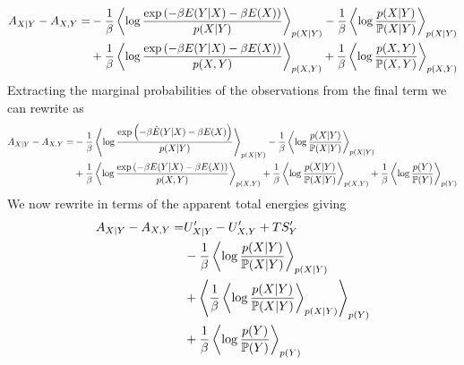 \documentclass[]{article}
\begin{document}
%
\begin{align*}
A_{X|Y} - A_{X,Y} =  & -\frac{1}{\beta}\left\langle \log \frac{\exp\left(-\beta E(Y|X) -\beta E(X)\right)}{p(X|Y) } \right\rangle_{p(X|Y) } - \frac{1}{\beta}\left\langle \log \frac{p(X|Y)}{\mathbb{P}(X|Y) } \right\rangle_{p(X|Y) }\\
& +\frac{1}{\beta}\left\langle \log \frac{\exp\left(-\beta E(Y|X) -\beta E(X)\right)}{p(X,Y) } \right\rangle_{p(X,Y) } + \frac{1}{\beta}\left\langle \log \frac{p(X,Y)}{\mathbb{P}(X,Y) } \right\rangle_{p(X,Y) }
\end{align*} 
Extracting the marginal probabilities of the observations from the final term we can rewrite as 
\begin{align*}
A_{X|Y} - A_{X,Y} =  & -\frac{1}{\beta}\left\langle \log \frac{\exp\left(-\beta \hat{E}(Y|X) -\beta E(X)\right)}{p(X|Y) } \right\rangle_{p(X|Y) } - \frac{1}{\beta}\left\langle \log \frac{p(X|Y)}{\mathbb{P}(X|Y) } \right\rangle_{p(X|Y) }\\
& +\frac{1}{\beta}\left\langle \log \frac{\exp\left(-\beta E(Y|X) -\beta E(X)\right)}{p(X,Y) } \right\rangle_{p(X,Y) } + \frac{1}{\beta}\left\langle \log \frac{p(X|Y)}{\mathbb{P}(X|Y) } \right\rangle_{p(X,Y) } + \frac{1}{\beta}\left\langle \log \frac{p(Y)}{\mathbb{P}(Y) } \right\rangle_{p(Y) }
\end{align*}
We now rewrite in terms of the apparent total energies giving 
\begin{align*}
A_{X|Y} - A_{X,Y} =  & U^\prime_{X|Y} - U^\prime_{X,Y} + TS^\prime_Y \\
& - \frac{1}{\beta}\left\langle \log\frac{p(X|Y)}{\mathbb{P}(X|Y) } \right\rangle_{p(X|Y) } \\
 & + \left\langle \frac{1}{\beta}\left\langle \log \frac{p(X|Y)}{\mathbb{P}(X|Y) } \right\rangle_{p(X|Y) } \right\rangle_{p(Y)}\\
&  + \frac{1}{\beta}\left\langle \log \frac{p(Y)}{\mathbb{P}(Y) } \right\rangle_{p(Y) }
\end{align*}
\end{document}
